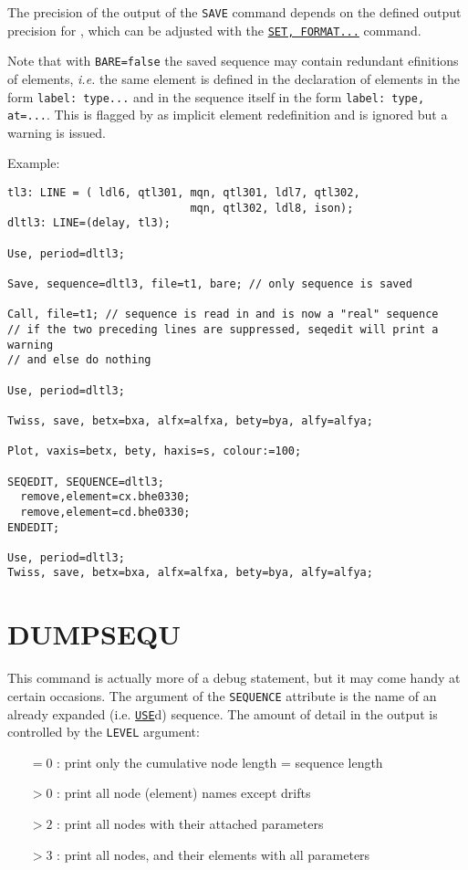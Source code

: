 
The precision of the output of the \texttt{SAVE} command depends on the
defined output precision for \madx, which can be adjusted with the
\hyperref[sec:set]{\texttt{SET, FORMAT...}} command.


Note that with \texttt{BARE=false} the saved sequence may contain redundant
efinitions of elements, \textsl{i.e.} the same element is defined in the
declaration  of elements in the form \texttt{label:\ type...} and in the
sequence itself in the form \texttt{label:\ type, at=...}. This is
flagged by \madx as implicit element redefinition and is ignored but a
warning is issued.

Example:
\begin{verbatim}
tl3: LINE = ( ldl6, qtl301, mqn, qtl301, ldl7, qtl302,
                            mqn, qtl302, ldl8, ison);
dltl3: LINE=(delay, tl3);

Use, period=dltl3;

Save, sequence=dltl3, file=t1, bare; // only sequence is saved

Call, file=t1; // sequence is read in and is now a "real" sequence
// if the two preceding lines are suppressed, seqedit will print a warning
// and else do nothing

Use, period=dltl3;

Twiss, save, betx=bxa, alfx=alfxa, bety=bya, alfy=alfya;

Plot, vaxis=betx, bety, haxis=s, colour:=100;

SEQEDIT, SEQUENCE=dltl3;
  remove,element=cx.bhe0330;
  remove,element=cd.bhe0330;
ENDEDIT;

Use, period=dltl3;
Twiss, save, betx=bxa, alfx=alfxa, bety=bya, alfy=alfya;
\end{verbatim}


\section{DUMPSEQU}
\label{sec:dumpsequ}
This command is actually more of a debug statement, but it may come handy at certain
occasions. The argument of the \texttt{SEQUENCE} attribute is the name of an
already expanded (i.e. \hyperref[sec:use]{\texttt{USE}}d) sequence. The amount of
detail in the output is controlled by the \texttt{LEVEL} argument:
\begin{itemize}
\item[$=0$ : ]    print only the cumulative node length = sequence length
\item[$>0$ : ]    print all node (element) names except drifts
\item[$>2$ : ]    print all nodes with their attached parameters
\item[$>3$ : ]    print all nodes, and their elements with all parameters
\end{itemize}

